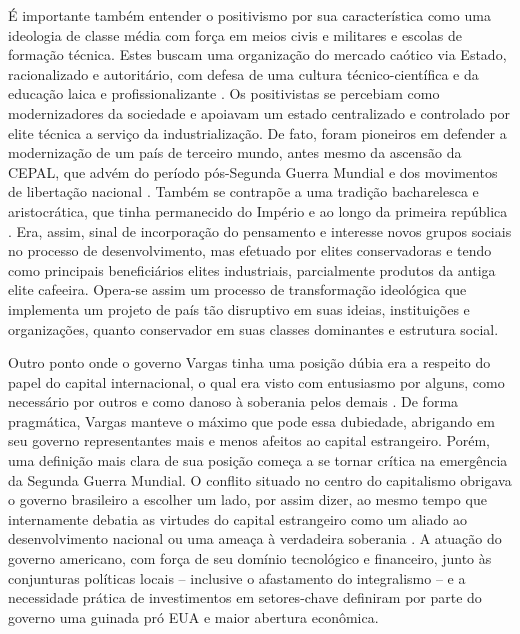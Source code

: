 É importante também entender o positivismo por sua característica como
uma ideologia de classe média com força em meios civis e militares e
escolas de formação técnica. Estes buscam uma
organização do mercado caótico via Estado, racionalizado e autoritário,
com defesa de uma cultura técnico-científica e da educação laica e
profissionalizante \citep{perissinotto_ideias_2023}. Os positivistas se percebiam como
modernizadores da sociedade e apoiavam um estado centralizado e
controlado por elite técnica a serviço da industrialização. De fato,
foram pioneiros em defender a modernização de um país de terceiro mundo,
antes mesmo da ascensão da CEPAL, que advém do período pós-Segunda Guerra Mundial
e dos movimentos de libertação nacional \citep{perissinotto_ideias_2023}. Também se
contrapõe a uma tradição bacharelesca e aristocrática, que tinha
permanecido do Império e ao longo da primeira república \citep{perissinotto_ideias_2023}.
Era, assim, sinal de incorporação do pensamento e interesse novos grupos
sociais no processo de desenvolvimento, mas efetuado por elites
conservadoras e tendo como principais beneficiários elites industriais,
parcialmente produtos da antiga elite cafeeira. Opera-se assim um
processo de transformação ideológica que implementa um projeto de país
tão disruptivo em suas ideias, instituições e organizações, quanto
conservador em suas classes dominantes e estrutura social.

Outro ponto onde o governo Vargas tinha uma posição dúbia
era a respeito do papel do capital internacional,
o qual era visto com entusiasmo por alguns, como
necessário por outros e como danoso à soberania pelos demais
\citep{perissinotto_ideias_2023}.
De forma pragmática, Vargas manteve o
máximo que pode essa dubiedade, abrigando em seu governo representantes
mais e menos afeitos ao capital estrangeiro. Porém, uma definição mais
clara de sua posição começa a se tornar crítica na emergência da Segunda Guerra Mundial.
O conflito situado no centro do capitalismo
obrigava o governo brasileiro a escolher um lado, por assim dizer, ao
mesmo tempo que internamente debatia as virtudes do capital estrangeiro
como um aliado ao desenvolvimento nacional ou uma ameaça à verdadeira
soberania \citep{perissinotto_ideias_2023}. 
A atuação do governo americano, com força
de seu domínio tecnológico e financeiro, junto às conjunturas políticas locais
-- inclusive o afastamento do integralismo -- e a necessidade prática de
investimentos em setores-chave definiram por parte do governo uma guinada pró EUA e maior
abertura econômica.


